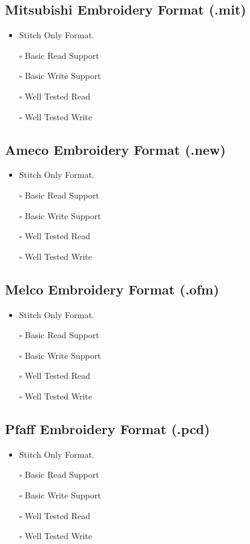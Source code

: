 \documentclass[onesize, a4paper]{refart}
\providecommand{\tightlist}{\setlength{\itemsep}{0pt}\setlength{\parskip}{0pt}}
\begin{document}
\subsection{Mitsubishi Embroidery Format (.mit)}

\begin{itemize}
\tightlist
\item Stitch Only Format.
\item[$\square$] Basic Read Support
\item[$\square$] Basic Write Support
\item[$\square$] Well Tested Read
\item[$\square$] Well Tested Write
\end{itemize}

\subsection{Ameco Embroidery Format (.new)}

\begin{itemize}
\tightlist
\item Stitch Only Format.
\item[$\square$] Basic Read Support
\item[$\square$] Basic Write Support
\item[$\square$] Well Tested Read
\item[$\square$] Well Tested Write
\end{itemize}

\subsection{Melco Embroidery Format (.ofm)}

\begin{itemize}
\tightlist
\item Stitch Only Format.
\item[$\square$] Basic Read Support
\item[$\square$] Basic Write Support
\item[$\square$] Well Tested Read
\item[$\square$] Well Tested Write
\end{itemize}

\subsection{Pfaff Embroidery Format (.pcd)}

\begin{itemize}
\tightlist
\item Stitch Only Format.
\item[$\square$] Basic Read Support
\item[$\square$] Basic Write Support
\item[$\square$] Well Tested Read
\item[$\square$] Well Tested Write
\end{itemize}
\end{document}
